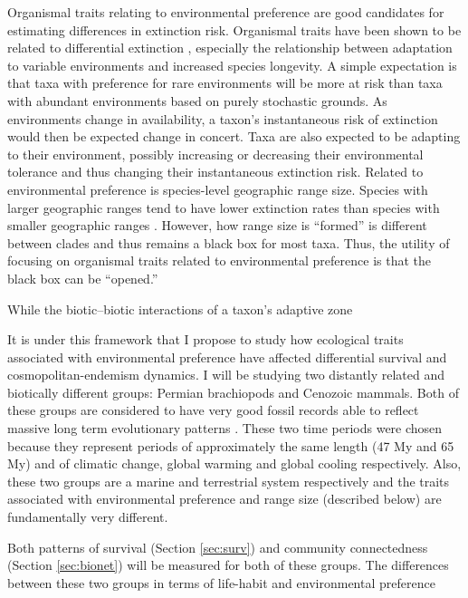 \documentclass[12pt,letterpaper]{article}
\begin{document}
Organismal traits relating to environmental preference are good candidates for estimating differences in extinction risk. Organismal traits have been shown to be related to differential extinction \citep{Foote2013,Liow2007b,Baumiller1993,Nurnberg2013a}, especially the relationship between adaptation to variable environments and increased species longevity. A simple expectation is that taxa with preference for rare environments will be more at risk than taxa with abundant environments based on purely stochastic grounds. As environments change in availability, a taxon's instantaneous risk of extinction would then be expected change in concert. Taxa are also expected to be adapting to their environment, possibly increasing or decreasing their environmental tolerance and thus changing their instantaneous extinction risk. Related to environmental preference is species-level geographic range size. Species with larger geographic ranges tend to have lower extinction rates than species with smaller geographic ranges \citep{Jablonski1986,Harnik2013,Nurnberg2013a,Jablonski2003,Roy2009c}. However, how range size is ``formed'' is different between clades \citep{Jablonski1987} and thus remains a black box for most taxa. Thus, the utility of focusing on organismal traits related to environmental preference is that the black box can be ``opened.''

While the biotic--biotic interactions of a taxon's adaptive zone

It is under this framework that I propose to study how ecological traits associated with environmental preference have affected differential survival and cosmopolitan-endemism dynamics. I will be studying two distantly related and biotically different groups: Permian brachiopods and Cenozoic mammals. Both of these groups are considered to have very good fossil records able to reflect massive long term evolutionary patterns \citep{Mark1977}. These two time periods were chosen because they represent periods of approximately the same length (47 My and 65 My) and of climatic change, global warming and global cooling respectively. Also, these two groups are a marine and terrestrial system respectively and the traits associated with environmental preference and range size (described below) are fundamentally very different. 


Both patterns of survival (Section \ref{sec:surv}) and community connectedness (Section \ref{sec:bionet}) will be measured for both of these groups. The differences between these two groups in terms of life-habit and environmental preference 
\end{document}
